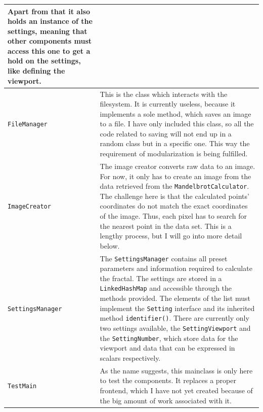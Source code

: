 \documentclass[10pt,a4paper,titlepage]{article}
\begin{document}
\begin{table}[h!]
\begin{tabular}{p{}|p{}}
			Apart from that it also holds an instance of the settings, meaning that other components must access this one to get a hold on the settings, like defining the viewport. \\ 
			\hline
			\verb|FileManager|& This is the class which interacts with the filesystem. It is currently useless, because it implements a sole method, which saves an image to a file. I have only included this class, so all the code related to saving will not end up in a random class but in a specific one. This way the requirement of modularization is being fulfilled. \\ 
			\hline
			\verb|ImageCreator|& The image creator converts raw data to an image. For now, it only has to create an image from the data retrieved from the \verb|MandelbrotCalculator|. The challenge here is that the calculated points' coordinates do not match the exact coordinates of the image. Thus, each pixel has to search for the nearest point in the data set. This is a lengthy process, but I will go into more detail below. \\ 
			\hline 
			\verb|SettingsManager|& The \verb|SettingsManager| contains all preset parameters and information required to calculate the fractal. The settings are stored in a \verb|LinkedHashMap| and accessible through the methods provided. The elements of the list must implement the \verb|Setting| interface and its inherited method \verb|identifier()|. There are currently only two settings available, the \verb|SettingViewport| and the \verb|SettingNumber|, which store data for the viewport and data that can be expressed in scalars respectively. \\ 
			\hline 
			\verb|TestMain|& As the name suggests, this mainclass is only here to test the components. It replaces a proper frontend, which I have not yet created because of the big amount of work associated with it. \\ 
		\end{tabular} 
	\end{table}
	
\end{document}
